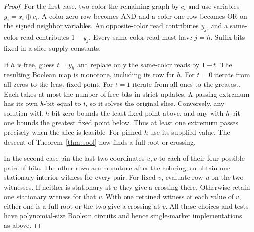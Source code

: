 \documentclass[11pt,oneside,openany,notitlepage]{report}
\begin{document}
\begin{proof}
For the first case, two-color the remaining graph by \(c_i\) and use
variables \(y_i=x_i\oplus c_i\). A color-zero row becomes AND and a
color-one row becomes OR on the signed neighbor variables. An
opposite-color read contributes \(y_j\), and a same-color read
contributes \(1-y_j\). Every same-color read must have \(j=h\).
Suffix bits fixed in a slice supply constants.

If \(h\) is free, guess \(t=y_h\) and replace only the same-color reads
by \(1-t\). The resulting Boolean map is monotone, including its row
for \(h\). For \(t=0\) iterate from all zeros to the least fixed point.
For \(t=1\) iterate from all ones to the greatest. Each takes at most
the number of free bits in strict updates. A passing extremum has its
own \(h\)-bit equal to \(t\), so it solves the original slice. Conversely,
any solution with \(h\)-bit zero bounds the least fixed point above,
and any with \(h\)-bit one bounds the greatest fixed point below.
Thus at least one extremum passes precisely when the slice is feasible.
For pinned \(h\) use its supplied value. The descent of
Theorem~\ref{thm:bool} now finds a full root or crossing.

In the second case pin the last two coordinates \(u,v\) to each of
their four possible pairs of bits. The other rows are monotone after
the coloring, so obtain one stationary interior witness for every pair.
For fixed \(v\), evaluate row \(u\) on the two witnesses. If neither is
stationary at \(u\) they give a crossing there. Otherwise retain one
stationary witness for that \(v\). With one retained witness at each
value of \(v\), either one is a full root or the two give a crossing at
\(v\). All these choices and tests have polynomial-size Boolean circuits
and hence single-market implementations as above.
\end{proof}
\end{document}
